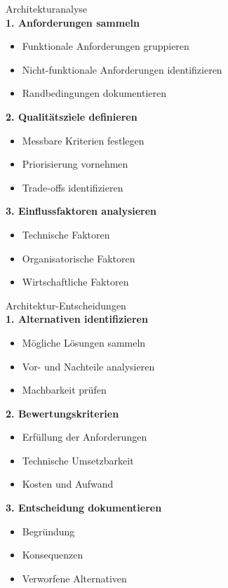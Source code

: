 \begin{KR}{Architekturanalyse}\\
\textbf{1. Anforderungen sammeln}
\begin{itemize}
    \item Funktionale Anforderungen gruppieren
    \item Nicht-funktionale Anforderungen identifizieren
    \item Randbedingungen dokumentieren
\end{itemize}

\textbf{2. Qualitätsziele definieren}
\begin{itemize}
    \item Messbare Kriterien festlegen
    \item Priorisierung vornehmen
    \item Trade-offs identifizieren
\end{itemize}

\textbf{3. Einflussfaktoren analysieren}
\begin{itemize}
    \item Technische Faktoren
    \item Organisatorische Faktoren
    \item Wirtschaftliche Faktoren
\end{itemize}
\end{KR}

\begin{KR}{Architektur-Entscheidungen}\\
\textbf{1. Alternativen identifizieren}
\begin{itemize}
    \item Mögliche Lösungen sammeln
    \item Vor- und Nachteile analysieren
    \item Machbarkeit prüfen
\end{itemize}

\textbf{2. Bewertungskriterien}
\begin{itemize}
    \item Erfüllung der Anforderungen
    \item Technische Umsetzbarkeit
    \item Kosten und Aufwand
\end{itemize}

\textbf{3. Entscheidung dokumentieren}
\begin{itemize}
    \item Begründung
    \item Konsequenzen
    \item Verworfene Alternativen
\end{itemize}
\end{KR}

